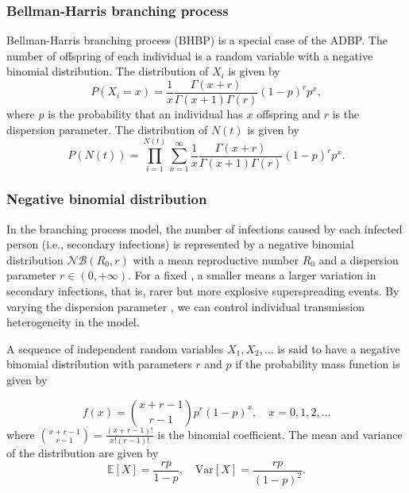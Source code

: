 \documentclass{article}
\begin{document}
\subsubsection*{Bellman-Harris branching process}
Bellman-Harris branching process (BHBP) is a special case of the ADBP. The number of offspring of each individual is a random variable with a negative binomial distribution. The distribution of $X_i$ is given by
\begin{equation}
P(X_i = x) = \frac{1}{x} \frac{\Gamma(x+r)}{\Gamma(x+1) \Gamma(r)} (1-p)^r p^x,
\end{equation}
where $p$ is the probability that an individual has $x$ offspring and $r$ is the dispersion parameter. The distribution of $N(t)$ is given by
\begin{equation}
P(N(t)) = \prod_{i=1}^{N(t)} \sum_{x=1}^{\infty} \frac{1}{x} \frac{\Gamma(x+r)}{\Gamma(x+1) \Gamma(r)} (1-p)^r p^x.
\end{equation}

\subsubsection*{Negative binomial distribution}

In the branching process model, the number of infections caused by each infected person (i.e., secondary infections) is represented by a negative binomial distribution $\mathcal{NB}(R_{0}, r)$ with a mean reproductive number $R_{0}$ and a dispersion parameter $r \in (0, +\infty)$. For a fixed , a smaller  means a larger variation in secondary infections, that is, rarer but more explosive superspreading events. By varying the dispersion parameter , we can control individual transmission heterogeneity in the model. 

A sequence of independent random variables $X_1, X_2, \ldots$ is said to have a negative binomial distribution with parameters $r$ and $p$ if the probability mass function is given by

\begin{equation}
    f(x) = \binom{x+r-1}{r-1} p^r (1-p)^x, \quad x = 0, 1, 2, \ldots
\end{equation}
where $\binom{x+r-1}{r-1} = \frac{(x+r-1)!}{x! (r-1)!}$ is the binomial coefficient. The mean and variance of the distribution are given by
\begin{equation}
    \mathbb{E}[X] = \frac{rp}{1-p}, \quad \text{Var}[X] = \frac{rp}{(1-p)^2}.
\end{equation}
\end{document}
